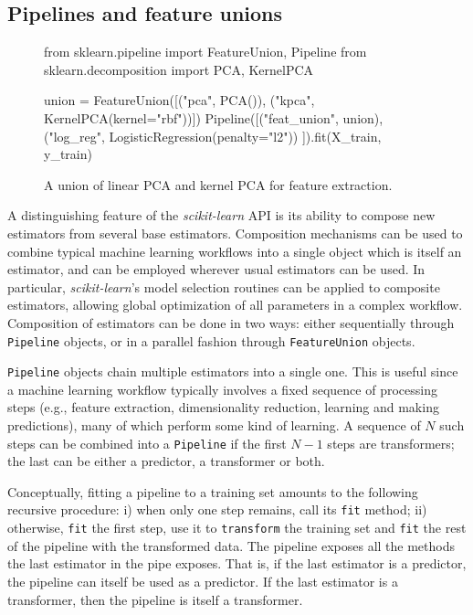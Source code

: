 \documentclass[twocolumn]{article}
\newcommand{\sklearn}{\textit{scikit-learn}\xspace}
\begin{document}
\subsection{Pipelines and feature unions}

\begin{figure*}[t]
\begin{pythoncode}
from sklearn.pipeline import FeatureUnion, Pipeline
from sklearn.decomposition import PCA, KernelPCA

union = FeatureUnion([("pca", PCA()),
                      ("kpca", KernelPCA(kernel="rbf"))])
Pipeline([("feat_union", union),
          ("log_reg", LogisticRegression(penalty="l2"))
         ]).fit(X_train, y_train)
\end{pythoncode}
\caption{A union of linear PCA and kernel PCA for feature extraction.}
\label{pca-union}
\end{figure*}

A distinguishing feature of the \sklearn API is its ability to
compose new estimators from several base estimators. Composition mechanisms can
be used to combine typical machine learning workflows into a single object which
is itself an estimator, and can be employed wherever usual estimators can be used.
In particular, \sklearn's model selection routines
can be applied to composite estimators, allowing global optimization
of all parameters in a complex workflow.
Composition of estimators can be done in two
ways: either sequentially through \texttt{Pipeline} objects, or in a parallel
fashion through \texttt{FeatureUnion} objects.

\texttt{Pipeline} objects chain multiple estimators into a single one. This is
useful since a machine learning workflow typically involves a fixed sequence of
processing steps (e.g., feature extraction, dimensionality reduction, learning
and making predictions), many of which perform some kind of learning.
A sequence of $N$ such steps can be combined into a
\texttt{Pipeline} if the first $N-1$ steps are transformers; the last can be
either a predictor, a transformer or both.

Conceptually, fitting a pipeline to
a training set amounts to the following recursive procedure: i) when only one
step remains, call its \texttt{fit} method; ii) otherwise, \texttt{fit} the
first step, use it to \texttt{transform} the training set and \texttt{fit} the
rest of the pipeline with the transformed data. The pipeline exposes all the
methods the last estimator in the pipe exposes. That is, if the last estimator
is a predictor, the pipeline can itself be used as a predictor. If the last
estimator is a transformer, then the pipeline is itself a transformer.
\end{document}
